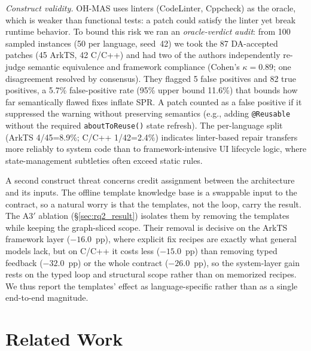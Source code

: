 \documentclass[10pt,conference]{IEEEtran}
\begin{document}
\textit{Construct validity.} OH-MAS uses linters (CodeLinter, Cppcheck) as the oracle, which is weaker than functional tests: a patch could satisfy the linter yet break runtime behavior. To bound this risk we ran an \emph{oracle-verdict audit}: from 100 sampled instances (50 per language, seed~42) we took the 87 DA-accepted patches (45 ArkTS, 42 C/C++) and had two of the authors independently re-judge semantic equivalence and framework compliance (Cohen's $\kappa{=}0.89$; one disagreement resolved by consensus). They flagged 5 false positives and 82 true positives, a 5.7\% false-positive rate (95\% upper bound 11.6\%) that bounds how far semantically flawed fixes inflate SPR. A patch counted as a false positive if it suppressed the warning without preserving semantics (e.g., adding \texttt{@Reusable} without the required \texttt{aboutToReuse()} state refresh). The per-language split (ArkTS 4/45=8.9\%; C/C++ 1/42=2.4\%) indicates linter-based repair transfers more reliably to system code than to framework-intensive UI lifecycle logic, where state-management subtleties often exceed static rules.

A second construct threat concerns credit assignment between the architecture and its inputs. The offline template knowledge base is a swappable input to the contract, so a natural worry is that the templates, not the loop, carry the result. The A3$'$ ablation (\S\ref{sec:rq2_result}) isolates them by removing the templates while keeping the graph-sliced scope. Their removal is decisive on the ArkTS framework layer ($-16.0$~pp), where explicit fix recipes are exactly what general models lack, but on C/C++ it costs less ($-15.0$~pp) than removing typed feedback ($-32.0$~pp) or the whole contract ($-26.0$~pp), so the system-layer gain rests on the typed loop and structural scope rather than on memorized recipes. We thus report the templates' effect as language-specific rather than as a single end-to-end magnitude.


\section{Related Work}
\label{sec:related}
\end{document}
